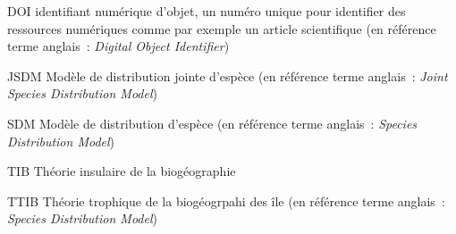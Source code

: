 \listeabrev
\begin{liste}

\item[DOI] identifiant numérique d'objet, un numéro unique pour identifier des ressources numériques comme par exemple un article scientifique (en référence terme anglais~: \textit{Digital Object Identifier})

\item[JSDM] Modèle de distribution jointe d'espèce (en référence terme anglais~: \textit{Joint Species Distribution Model})

\item[SDM] Modèle de distribution d'espèce (en référence terme anglais~: \textit{Species Distribution Model})

\item[TIB] Théorie insulaire de la biogéographie

\item[TTIB] Théorie trophique de la biogéogrpahi des île (en référence terme anglais~: \textit{Species Distribution Model})

\end{liste}




%
%


\cleardoublepage
